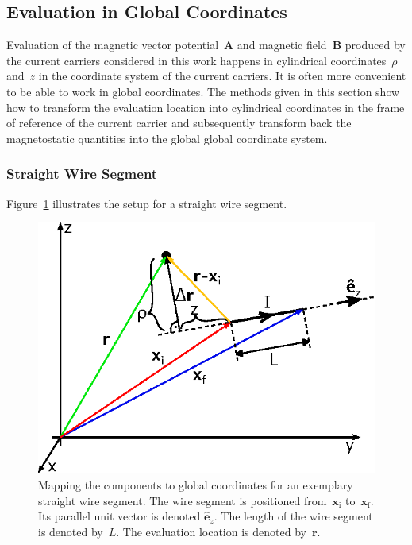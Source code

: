 \subsection{Evaluation in Global Coordinates}
Evaluation of the magnetic vector potential~$\mathbf{A}$ and magnetic field~$\mathbf{B}$
produced by the current carriers considered in this work
happens in cylindrical coordinates~$\rho$ and~$z$
in the coordinate system of the current carriers.
It is often more convenient to be able to work in global coordinates.
The methods given in this section show how to transform the evaluation location
into cylindrical coordinates in the frame of reference of the current carrier
and subsequently transform back the magnetostatic quantities into the global global coordinate system.

\subsubsection{Straight Wire Segment}
Figure~\ref{fig:StraightWireSegment_MappingToCartesian} illustrates the setup for a straight wire segment.
\begin{figure}[htbp]
 \centering
 \includegraphics{img/StraightWireSegment_MappingToCartesian.eps}
 \caption{Mapping the components to global coordinates for an exemplary straight wire segment.
          The wire segment is positioned from~$\mathbf{x}_\mathrm{i}$ to~$\mathbf{x}_\mathrm{f}$.
          Its parallel unit vector is denoted $\hat{\mathbf{e}}_z$.
          The length of the wire segment is denoted by~$L$.
          The evaluation location is denoted by~$\mathbf{r}$.}
 \label{fig:StraightWireSegment_MappingToCartesian}
\end{figure}
